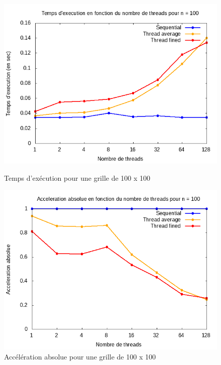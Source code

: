 \documentclass[10pt,a4paper]{article}
\begin{document}
\begin{figure}[!tbp]
  \centering
  \begin{minipage}[b]{0.49\textwidth}
	\includegraphics[width=\textwidth]{./Time/size_100_time.png}
    \caption{Temps d'exécution pour une grille de 100 x 100}
  \end{minipage}
  \hfill
  \begin{minipage}[b]{0.49\textwidth}
    \includegraphics[width=\textwidth]{./Time/size_100_acceleration.png}
    \caption{Accélération absolue pour une grille de 100 x 100}
  \end{minipage}
\end{figure}
\end{document}
